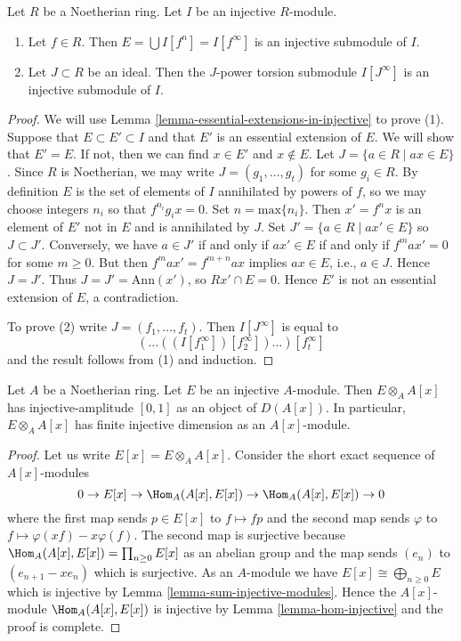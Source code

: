 \begin{lemma}
\label{lemma-injective-module-divide}
Let $R$ be a Noetherian ring. Let $I$ be an injective $R$-module.
\begin{enumerate}
\item Let $f \in R$. Then $E = \bigcup I[f^n] = I[f^\infty]$
is an injective submodule of $I$.
\item Let $J \subset R$ be an ideal. Then the $J$-power torsion
submodule $I[J^\infty]$ is an injective submodule of $I$.
\end{enumerate}
\end{lemma}

\begin{proof}
We will use Lemma \ref{lemma-essential-extensions-in-injective}
to prove (1).
Suppose that $E \subset E' \subset I$ and that $E'$ is an essential
extension of $E$. We will show that $E' = E$. If not, then we can
find $x \in E'$ and $x \not \in E$.
Let $J = \{ a \in R \mid ax \in E\}$. Since $R$ is Noetherian,
we may write $J = (g_1, \ldots, g_t)$ for some
$g_i \in R$. By definition $E$ is the set of elements of $I$ annihilated
by powers of $f$, so we may choose integers $n_i$ so that $f^{n_i}g_ix = 0$.
Set $n = \mathrm{max}\{ n_i \}$. Then $x' = f^n x$ is an element of $E'$
not in $E$ and is annihilated by $J$. Set $J' = \{ a \in R \mid ax' \in E \}$
so $J \subset J'$. Conversely, we have $a \in J'$ if and only if $ax' \in E$
if and only if $f^m a x' = 0$ for some $m \geq 0$. But then
$f^m a x' = f^{m + n} a x$ implies $ax \in E$, i.e., $a \in J$.
Hence $J = J'$. Thus $J = J' = \text{Ann}(x')$, so $Rx' \cap E  = 0$.
Hence $E'$ is not an essential extension of $E$, a contradiction.

\medskip\noindent
To prove (2) write $J = (f_1, \ldots, f_t)$. Then
$I[J^\infty]$ is equal to
$$
(\ldots((I[f_1^\infty])[f_2^\infty])\ldots)[f_t^\infty]
$$
and the result follows from (1) and induction.
\end{proof}

\begin{lemma}
\label{lemma-injective-dimension-over-polynomial-ring}
Let $A$ be a Noetherian ring. Let $E$ be an injective $A$-module.
Then $E \otimes_A A[x]$ has injective-amplitude $[0, 1]$
as an object of $D(A[x])$. In particular, $E \otimes_A A[x]$
has finite injective dimension as an $A[x]$-module.
\end{lemma}

\begin{proof}
Let us write $E[x] = E \otimes_A A[x]$. Consider the short exact
sequence of $A[x]$-modules
$$
0 \to E[x] \to \Hom_A(A[x], E[x]) \to \Hom_A(A[x], E[x]) \to 0
$$
where the first map sends $p \in E[x]$ to $f \mapsto fp$ and the
second map sends $\varphi$ to $f \mapsto \varphi(xf) - x\varphi(f)$.
The second map is surjective because
$\Hom_A(A[x], E[x]) = \prod_{n \geq 0} E[x]$ as an abelian group and
the map sends $(e_n)$ to $(e_{n + 1} - xe_n)$ which is surjective.
As an $A$-module we have $E[x] \cong \bigoplus_{n \geq 0} E$
which is injective by Lemma \ref{lemma-sum-injective-modules}.
Hence the $A[x]$-module $\Hom_A(A[x], E[x])$ is injective by
Lemma \ref{lemma-hom-injective} and the proof is complete.
\end{proof}



